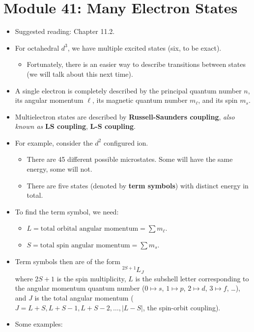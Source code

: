\documentclass[../notes.tex]{subfiles}
\begin{document}
\section{Module 41: Many Electron States}
\begin{itemize}
    \item Suggested reading: Chapter 11.2.
    \item For octahedral $d^3$, we have multiple excited states (six, to be exact).
    \begin{itemize}
        \item Fortunately, there is an easier way to describe transitions between states (we will talk about this next time).
    \end{itemize}
    \item A single electron is completely described by the principal quantum number $n$, its angular momentum $\ell$, its magnetic quantum number $m_\ell$, and its spin $m_s$.
    \item Multielectron states are described by \textbf{Russell-Saunders coupling}, \emph{also known as} \textbf{LS coupling}, \textbf{L-S coupling}.
    \item For example, consider the $d^2$ configured  ion.
    \begin{itemize}
        \item There are 45 different possible microstates. Some will have the same energy, some will not.
        \item There are five states (denoted by \textbf{term symbols}) with distinct energy in total.
    \end{itemize}
    \item To find the term symbol, we need:
    \begin{itemize}
        \item $L=\text{total orbital angular momentum}=\sum m_\ell$.
        \item $S=\text{total spin angular momentum}=\sum m_s$.
    \end{itemize}
    \item Term symbols then are of the form
    \begin{equation*}
        {}^{2S+1}L_J
    \end{equation*}
    where $2S+1$ is the spin multiplicity, $L$ is the subshell letter corresponding to the angular momentum quantum number ($0\mapsto s$, $1\mapsto p$, $2\mapsto d$, $3\mapsto f$, \dots), and $J$ is the total angular momentum ($J=L+S,L+S-1,L+S-2,\dots,|L-S|$, the spin-orbit coupling).
    \item Some examples:

\end{itemize}
\end{document}
